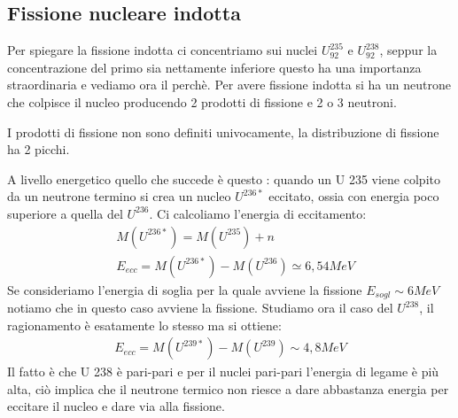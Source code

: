 \subsection{Fissione nucleare indotta}
Per spiegare la fissione indotta ci concentriamo sui nuclei $U^{235}_{92}$ e $U^{238}_{92}$, 
seppur la concentrazione del primo sia nettamente inferiore questo ha una importanza straordinaria
e vediamo ora il perchè.
Per avere fissione indotta si ha un neutrone che colpisce il nucleo producendo 2 prodotti di fissione e
2 o 3 neutroni.
\begin{tcolorbox}[colback=red!5!white,colframe=red!50!black,title=ATTENZIONE !]
I prodotti di fissione non sono definiti univocamente, la distribuzione di fissione ha 2 picchi.
\end{tcolorbox}
A livello energetico quello che succede è questo : quando un U 235 viene colpito da un neutrone 
termino si crea un nucleo $U^{236*}$ eccitato, ossia con energia poco superiore a quella del
$U^{236}$.
Ci calcoliamo l'energia di eccitamento:
\begin{align*}
    &M(U^{236*}) = M(U^{235})+n \\
    &E_{ecc} = M(U^{236*})-M(U^{236}) \simeq 6,54MeV 
\end{align*}
Se consideriamo l'energia di soglia per la quale avviene la fissione $E_{sogl}\sim 6MeV$ notiamo che in 
questo caso avviene la fissione.
Studiamo ora il caso del $U^{238}$, il ragionamento è esatamente lo stesso ma si ottiene:
\begin{align*}
    E_{ecc} = M(U^{239*})-M(U^{239}) \sim 4,8MeV
\end{align*}
Il fatto è che U 238 è pari-pari e per il nuclei pari-pari l'energia di legame è più alta,
ciò implica che il neutrone termico non riesce a dare abbastanza energia per eccitare il nucleo e 
dare via alla fissione.
